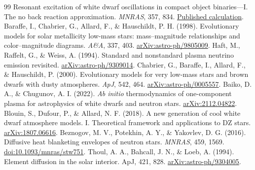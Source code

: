 \documentclass[11pt,letterpaper]{article}
\begin{document}
\begin{thebibliography}{99}
Resonant excitation of white dwarf oscillations in compact object binaries---I.
The no back reaction approximation.
\emph{MNRAS}, 357, 834.
\href{https://academic.oup.com/mnras/article/357/3/834/1077414}{Published calculation}.
 Baraffe, I., Chabrier, G., Allard, F., \& Hauschildt, P. H. (1998).
Evolutionary models for solar metallicity low-mass stars: mass--magnitude
relationships and color--magnitude diagrams. \emph{A\&A}, 337, 403.
\href{https://arxiv.org/abs/astro-ph/9805009}{arXiv:astro-ph/9805009}.
 Haft, M., Raffelt, G., \& Weiss, A. (1994).
Standard and nonstandard plasma neutrino emission revisited.
\href{https://arxiv.org/abs/astro-ph/9309014}{arXiv:astro-ph/9309014}.
 Chabrier, G., Baraffe, I., Allard, F., \& Hauschildt, P. (2000).
Evolutionary models for very low-mass stars and brown dwarfs with dusty atmospheres.
\emph{ApJ}, 542, 464.
\href{https://arxiv.org/abs/astro-ph/0005557}{arXiv:astro-ph/0005557}.
 Baiko, D. A., \& Chugunov, A. I. (2022).
\emph{Ab initio} thermodynamics of one-component plasma for astrophysics of
white dwarfs and neutron stars.
\href{https://arxiv.org/abs/2112.04822}{arXiv:2112.04822}.
 Blouin, S., Dufour, P., \& Allard, N. F. (2018).
A new generation of cool white dwarf atmosphere models. I. Theoretical framework
and applications to DZ stars.
\href{https://arxiv.org/abs/1807.06616}{arXiv:1807.06616}.
 Beznogov, M. V., Potekhin, A. Y., \& Yakovlev, D. G. (2016).
Diffusive heat blanketing envelopes of neutron stars.
\emph{MNRAS}, 459, 1569.
\href{https://doi.org/10.1093/mnras/stw751}{doi:10.1093/mnras/stw751}.
 Thoul, A. A., Bahcall, J. N., \& Loeb, A. (1994).
Element diffusion in the solar interior. ApJ, 421, 828.
\href{https://arxiv.org/abs/astro-ph/9304005}{arXiv:astro-ph/9304005}.


\end{thebibliography}
\end{document}
